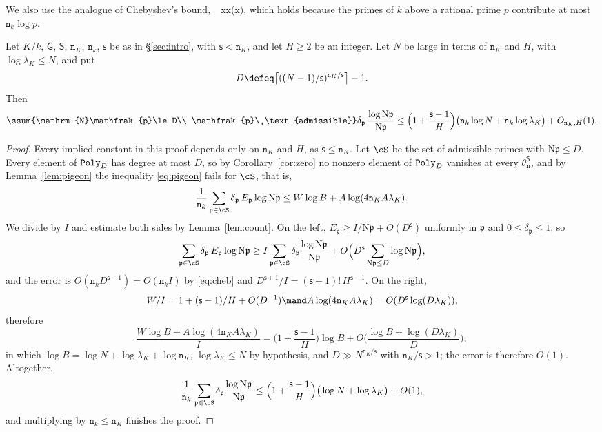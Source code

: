 \documentclass[11pt, reqno, twoside, letterpaper]{amsart}
\newcommand{\vn}{\mathbf{n}}
\newcommand{\Nm}{\mathrm{N}}
\newcommand{\fp}{\mathfrak{p}}
\newcommand{\dk}{{\mathtt{n}_k}}
\newcommand{\dK}{{\mathtt{n}_K}}
\newcommand{\wgt}{H}
\newcommand{\bxs}{N}
\newcommand{\dgb}{D}
\newcommand{\hB}{B}
\newcommand{\lamK}{\lambda_{\Kf}}
\newcommand{\galKk}{\mathsf{G}}
\newcommand{\Kf}{K}
\newcommand{\PolyD}{{\tt Poly}_\dgb}
\newcommand{\rr}{A}
\newcommand{\Ew}{E}
\newcommand{\Ic}{I}
\newcommand{\wt}{\delta}
\newcommand{\Sset}{\mathsf{S}}
\newcommand{\nS}{\mathsf{s}}
\begin{document}
We also use the analogue of Chebyshev's bound,
\be\label{eq:cheb}
\sum_{\Nm\fp\le x}\log\Nm\fp\le 2\dk x\qquad(x),
\ee
which holds because the primes of $k$ above a rational prime $p$
contribute at most $\dk\log p$.

\begin{proposition}\label{prop:main}
Let $\Kf/k$, $\galKk$, $\Sset$, $\dK$, $\dk$, $\nS$ be as in
\S\ref{sec:intro}, with $\nS<\dK$, and let $\wgt\ge 2$ be an integer.
Let $\bxs$ be large in terms of $\dK$ and $\wgt$, with
$\log\lamK\le\bxs$, and put
\[
\dgb\defeq\big\lceil((\bxs-1)/\nS)^{\dK/\nS}\big\rceil-1 .
\]
Then
\[
\ssum{\Nm\fp\le \dgb\\ \fp\ \text{admissible}}
\wt_\fp\,\frac{\log\Nm\fp}{\Nm\fp}
\le\Big(1+\frac{\nS-1}{\wgt}\Big)
\big(\dk\log \bxs+\dk\log\lamK\big)+O_{\dK,\wgt}(1).
\]
\end{proposition}

\begin{proof}
Every implied constant in this proof depends only on $\dK$ and
$\wgt$, as $\nS\le\dK$. Let $\cS$ be the set of admissible primes
with $\Nm\fp\le\dgb$. Every element of $\PolyD$ has degree at most
$\dgb$, so by Corollary~\ref{cor:zero} no nonzero element of $\PolyD$
vanishes at every $\theta_\vn^{\Sset}$, and by
Lemma~\ref{lem:pigeon} the inequality \eqref{eq:pigeon} fails for
$\cS$, that is,
\[
\frac1{\dk}\sum_{\fp\in\cS}\wt_\fp\,\Ew_\fp\log\Nm\fp
\le W\log\hB+\rr\log(4\dK\rr\lamK).
\]
We divide by $\Ic$ and estimate both sides by
Lemma~\ref{lem:count}. On the left, $\Ew_\fp\ge\Ic/\Nm\fp+O(\dgb^\nS)$
uniformly in $\fp$ and $0\le\wt_\fp\le 1$, so
\[
\sum_{\fp\in\cS}\wt_\fp\,\Ew_\fp\log\Nm\fp
\ge\Ic\sum_{\fp\in\cS}\wt_\fp\frac{\log\Nm\fp}{\Nm\fp}
+O\Big(\dgb^{\nS}\sum_{\Nm\fp\le\dgb}\log\Nm\fp\Big),
\]
and the error is $O(\dk\dgb^{\nS+1})=O(\dk\Ic)$ by \eqref{eq:cheb}
and $\dgb^{\nS+1}/\Ic=(\nS+1)!\,\wgt^{\nS-1}$. On the right,
\[
W/\Ic=1+(\nS-1)/\wgt+O(\dgb^{-1})
\mand
\rr\log(4\dK\rr\lamK)=O(\dgb^{\nS}\log(\dgb\lamK)),
\]
therefore
\[
\frac{W\log\hB+\rr\log(4\dK\rr\lamK)}{\Ic}
=\Big(1+\frac{\nS-1}{\wgt}\Big)\log\hB
+O\Big(\frac{\log\hB+\log(\dgb\lamK)}{\dgb}\Big),
\]
in which $\log\hB=\log\bxs+\log\lamK+\log\dK$, $\log\lamK\le\bxs$
by hypothesis, and $\dgb\gg\bxs^{\dK/\nS}$ with $\dK/\nS>1$; the
error is therefore $O(1)$. Altogether,
\[
\frac1{\dk}\sum_{\fp\in\cS}\wt_\fp\frac{\log\Nm\fp}{\Nm\fp}
\le\Big(1+\frac{\nS-1}{\wgt}\Big)
\big(\log\bxs+\log\lamK\big)+O(1),
\]
and multiplying by $\dk\le\dK$ finishes the proof.
\end{proof}
\end{document}
